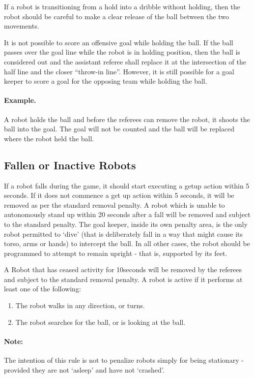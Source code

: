 \documentclass[12pt]{article}
\begin{document}
If a robot is transitioning from a hold into a dribble without holding,
then the robot should be careful to make a clear release of the ball
between the two movements.

It is not possible to score an offensive goal while holding the ball.  If the ball passes over the goal line while the robot is in holding position, then the ball is considered out
and the assistant referee shall replace it at the intersection of the
half line and the closer ``throw-in line''. However, it is still possible for a goal keeper to score a goal for the opposing team
while holding the ball.

\paragraph{Example.} A robot holds the ball and before the referees
can remove the robot, it shoots the ball into the goal.  The goal
will not be counted and the ball will be replaced where the robot
held the ball.

\subsection{Fallen or Inactive Robots}
\label{sec:fallenrobots}

If a robot falls during the game, it should start executing a getup action within 5 seconds. If it does not commence a get up action within 5 seconds, it will be removed as per the standard removal penalty. A robot which is unable to autonomously stand up within 20 seconds after a fall will be removed and subject to the standard penalty. The goal keeper, inside its own penalty area, is the only robot permitted to `dive' (that is deliberately fall in a way that might cause its torso, arms or hands) to intercept the ball. In all other cases, the robot should be programmed to attempt to remain upright - that is, supported by its feet.

A Robot that has ceased activity for 10seconds will be removed by the referees and subject to the standard removal penalty. A robot is active if it performs at least one of the following:
\begin{enumerate}
  \item {The robot walks in any direction, or turns.}
  \item {The robot searches for the ball, or is looking at the ball.}
\end{enumerate}

\paragraph{Note:} The intention of this rule is not to penalize robots simply for being stationary - provided they are not `asleep' and have not `crashed'.
\end{document}
